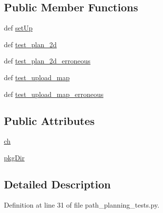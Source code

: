 \subsection*{Public Member Functions}
\begin{DoxyCompactItemize}
\item 
def \hyperlink{classpath__planning__tests_1_1PathPlanningTests_a12e4d5404152451b3eee157db707cb1b}{set\-Up}
\item 
def \hyperlink{classpath__planning__tests_1_1PathPlanningTests_a42220484ceb733fdf046c568548ceeb4}{test\-\_\-plan\-\_\-2d}
\item 
def \hyperlink{classpath__planning__tests_1_1PathPlanningTests_ad705c2d992960624b54c03303a9d62ad}{test\-\_\-plan\-\_\-2d\-\_\-erroneous}
\item 
def \hyperlink{classpath__planning__tests_1_1PathPlanningTests_a58f7b662b61412bd2e574630297cee28}{test\-\_\-upload\-\_\-map}
\item 
def \hyperlink{classpath__planning__tests_1_1PathPlanningTests_ad5c9c8c257da327f3daf5edd5e2f700a}{test\-\_\-upload\-\_\-map\-\_\-erroneous}
\end{DoxyCompactItemize}
\subsection*{Public Attributes}
\begin{DoxyCompactItemize}
\item 
\hyperlink{classpath__planning__tests_1_1PathPlanningTests_a81a52bfd96b456e3ac9eb4b072dbbcee}{ch}
\item 
\hyperlink{classpath__planning__tests_1_1PathPlanningTests_a25a3b46e073809adc0b02f8f3f27f7f5}{pkg\-Dir}
\end{DoxyCompactItemize}


\subsection{Detailed Description}


Definition at line 31 of file path\-\_\-planning\-\_\-tests.\-py.




